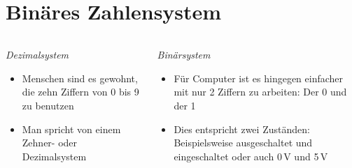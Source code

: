 
\section{Binäres Zahlensystem}
\label{section:binaer}
\begin{frame}%

\begin{columns}
    \begin{column}{0.48\textwidth}
    \emph{Dezimalsystem}

\begin{itemize}
  \item Menschen sind es gewohnt, die zehn Ziffern von 0 bis 9 zu benutzen
  \item Man spricht von einem Zehner- oder Dezimalsystem
  \end{itemize}

    \end{column}
   \begin{column}{0.48\textwidth}
       \emph{Binärsystem}

\begin{itemize}
  \item Für Computer ist es hingegen einfacher mit nur 2 Ziffern zu arbeiten: Der 0 und der 1
  \item Dies entspricht zwei Zuständen: Beispielsweise ausgeschaltet und eingeschaltet oder auch 0 V und 5 V
  \end{itemize}

   \end{column}
\end{columns}

\end{frame}

